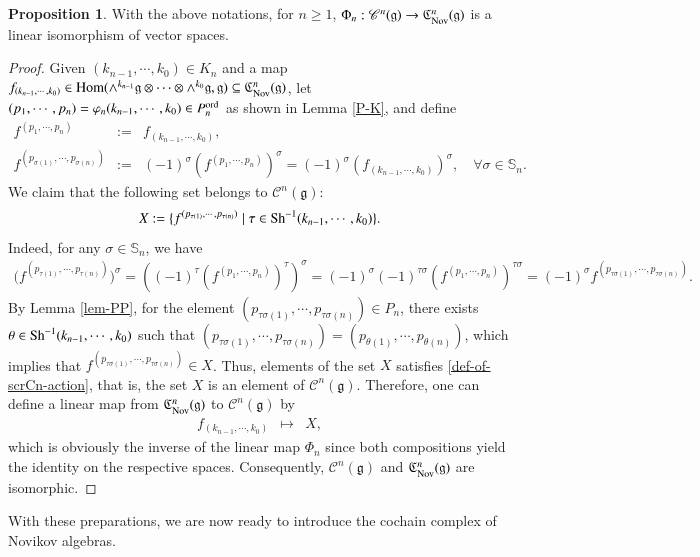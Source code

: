 \documentclass[12pt]{amsart}
\theoremstyle{definition}
\newtheorem{pro}[thm]{Proposition}
\newcommand{\g}{\mathfrak g}
\newcommand{\frkC}{\mathfrak C}
\newcommand{\Hom}{\mathrm{Hom}}
\newcommand{\ot}{\otimes}
\newcommand{\s}{\mathbb{S}}
\newcommand{\Sh}{{\rm Sh}}
\newcommand{\ord}{{\rm ord}}
\newcommand{\scrC}{{\mathscr{C}}}
\newcommand{\nov}{{\rm Nov}}
\begin{document}
\begin{pro}\label{psi}
With the above notations, for $n\geq 1$, $\Phi_n:\scrC^n(\g)\to \frkC^n_{\nov}(\g)$ is a linear isomorphism of vector spaces.	
\end{pro}
\begin{proof}
Given $(k_{n-1},\cdots,k_0)\in K_n$ and a map $f_{(k_{n-1},\cdots,k_0)}\in\Hom(\wedge^{k_{n-1}}\g\ot\cdots\ot\wedge^{k_0}\g,\g)\subseteq\frkC_{\nov}^n(\g)$, let $(p_1,\cdots,p_n)=\varphi_n(k_{n-1},\cdots,k_0) \in P_{n}^\ord$ as shown in Lemma \ref{P-K}, and define
\begin{eqnarray*}
f^{(p_1,\cdots,p_n)}&:=&f_{(k_{n-1},\cdots,k_0)},\\
f^{(p_{\sigma(1)},\cdots,p_{\sigma(n)})}&:=&(-1)^\sigma (f^{(p_1,\cdots,p_n)})^\sigma=(-1)^\sigma (f_{(k_{n-1},\cdots,k_0)})^\sigma,\quad \forall \sigma\in \mathbb{S}_n.
\end{eqnarray*}
  We claim that the following set belongs to $\scrC^n(\g)$:
$$X:=\{f^{(p_{\tau(1)},\cdots,p_{\tau(n)})}\mid\tau\in\Sh^{-1}(k_{n-1},\cdots,k_0)\}.$$
Indeed, for any $\sigma\in\s_n$, we have
\begin{align*}
	\big(f^{(p_{\tau(1)},\cdots,p_{\tau(n)})}\big)^\sigma=((-1)^\tau(f^{(p_1,\cdots,p_n)})^\tau)^\sigma =(-1)^\sigma (-1)^{\tau\sigma}(f^{(p_1,\cdots,p_n)})^{\tau\sigma}=(-1)^\sigma f^{(p_{\tau\sigma(1)}, \cdots,p_{\tau\sigma(n)})}.
\end{align*}
By Lemma \ref{lem-PP}, for the element $(p_{\tau\sigma(1)}, \cdots,p_{\tau\sigma(n)})\in P_n$, there exists $\theta\in\Sh^{-1}(k_{n-1},\cdots,k_0)$ such that $(p_{\tau\sigma(1)}, \cdots,p_{\tau\sigma(n)})=(p_{\theta(1)}, \cdots,p_{\theta(n)})$, which implies that $f^{(p_{\tau\sigma(1)}, \cdots,p_{\tau\sigma(n)})}\in X$. Thus, elements of the set $X$ satisfies \eqref{def-of-scrCn-action}, that is, the set $X$ is an element of $\scrC^n(\g)$. Therefore, one can define a linear map from $\frkC^n_{\nov}(\g)$ to $\scrC^n(\g)$ by
\begin{eqnarray*}
f_{(k_{n-1},\cdots,k_0)}&\mapsto&X,
\end{eqnarray*}
which is obviously the inverse of the linear map $\Phi_n$ since both compositions yield the identity on the respective spaces. Consequently, $\scrC^n(\g)$ and  $\frkC^n_{\nov}(\g)$ are isomorphic.
\end{proof}


 



With these preparations, we are now ready to introduce the cochain complex of Novikov algebras.
\end{document}
